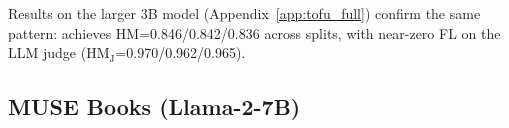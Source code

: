 Results on the larger 3B model (Appendix~\ref{app:tofu_full}) confirm the same pattern: \method achieves HM=0.846/0.842/0.836 across splits, with near-zero FL on the LLM judge (HM$_\text{J}$=0.970/0.962/0.965).

\subsection{MUSE Books (Llama-2-7B)}
\label{sec:muse_books}

\begin{table}[t!]
\centering
\small
\caption{MUSE Books results (5-fold). Left: automated metrics; HM = hmean(1$-$fk, 1$-$vm, rk). Right: LLM judge (0--2 scale). Best in \textbf{bold} (excl.\ Gold).}
\label{tab:muse_books}
\begin{minipage}[t]{0.48\textwidth}
\centering
{}
\end{minipage}%
\hfill
\begin{minipage}[t]{0.48\textwidth}
\centering
{}
\end{minipage}
\end{table}
